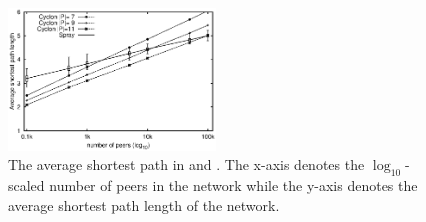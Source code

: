 \begin{figure}
  \centering
  \includegraphics[width=0.49\textwidth]{img/avgpath.eps}
  \caption{\label{fig:avgpath}The average shortest path in \SPRAY and
    \CYCLON. The x-axis denotes the $\log_{10}$-scaled number of peers in the
    network while the y-axis denotes the average shortest path length of the
    network.}
\end{figure}

